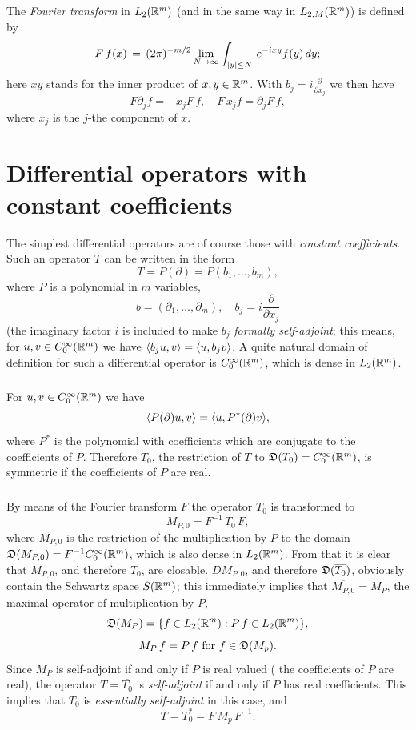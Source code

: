 \documentclass[11pt,twoside]{article}
\begin{document}
\subparagraph*{}
The \textit{Fourier transform} in $L_2({\mathbb{R}}^m)$
(and in the same way in $L_{2,M}({\mathbb{R}}^m)$) is defined by
\[
F\,f(x) \= (2\pi)^{-m/2} \lim_{N \to \infty}
\int_{\abs{y} \leq N} \,e^{-ixy} f(y) \,dy;
\]
here $xy$ stands for the inner product of $x,y \in {\mathbb{R}}^m$.
With $b_j = i \frac{\partial}{\partial x_j}$ we then have
\[
F \partial_j f = -x_j F\,f,
\quad
F\,x_jf = \partial_j F\,f,
\]
where $x_j$ is the $j$-the component of $x$.

\section{Differential operators with constant coefficients}                    %
The simplest differential operators are of course those
with \textit{constant coefficients}.
Such an operator $T$ can be written in the form
\[
T = P(\partial) = P(b_1,\ldots,b_m),
\]
where $P$ is a polynomial in $m$ variables,
\[
b = (\partial_1,\ldots,\partial_m), \quad b_j = i \frac{\partial}{\partial x_j}
\]
(the imaginary factor $i$ is included to make $b_j$
\textit{formally self-adjoint};
this means, for $u,v \in C_0^{\infty}({\mathbb{R}}^m)$ we have
$\langle b_j u,v \rangle = \langle u,b_j v \rangle$.
A quite natural domain of definition for such a differential operator
is $C_0^{\infty}({\mathbb{R}}^m)$,
which is dense in $L_2({\mathbb{R}}^m)$.

\subparagraph*{}
For $u,v \in C_0^{\infty}({\mathbb{R}}^m)$ we have
\[
\langle P(\partial) u,v \rangle = \langle u,P^*(\partial) v \rangle,
\]
where $P^*$ is the polynomial with coefficients
which are conjugate to the coefficients of $P$.
Therefore $T_0$,
the restriction of $T$ to $\mathfrak{D}(T_0) = C_0^{\infty}({\mathbb{R}}^m)$,
is symmetric if the coefficients of $P$ are real.

\subparagraph*{}
By means of the Fourier transform $F$ the operator $T_0$ is transformed to
\[
M_{P,0} = F^{-1} \, T_0 \, F,
\]
where $M_{P,0}$ is the restriction of the multiplication by $P$ to the domain
$\mathfrak{D}(M_{P,0}) = F^{-1} C_0^{\infty}({\mathbb{R}}^m)$,
which is also dense in $L_2({\mathbb{R}}^m)$.
From that it is clear that $M_{P,0}$,
and therefore $T_0$, are closable.
$D{\overline{M_{P,0}}}$,
and therefore $\mathfrak{D}(\overline{T_0})$,
obviously contain the Schwartz space $S({\mathbb{R}}^m)$;
this immediately implies that $\overline{M_{P,0}} = M_P$,
the maximal operator of multiplication by $P$, {\ie}
\[
\mathfrak{D}(M_P) = \{f \in L_2({\mathbb{R}}^m): P\,f \in L_2({\mathbb{R}}^m) \},
\]
\[
M_P\,f = P\,f \mbox{ for } f \in \mathfrak{D}(M_p).
\]
Since $M_P$ is self-adjoint if and only if $P$ is real valued
({\ie} the coefficients of $P$ are real),
the operator $T = \overline{T_0}$ is \textit{self-adjoint}
if and only if $P$ has real coefficients.
This implies that $T_0$ is \textit{essentially self-adjoint}
in this case, and
\[
T = T_0^* = F \, M_p \, F^{-1}.
\]
\end{document}
